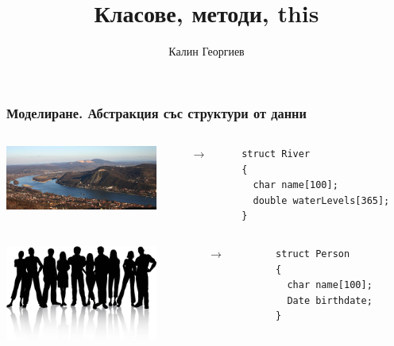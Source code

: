 \documentclass{beamer}
\begin{document}
\title[Обектно ориентирано програмиране]{Класове, методи, this}
\author{Калин Георгиев}
\frame{\titlepage}


\begin{frame}[fragile]
\frametitle{Моделиране. Абстракция със структури от данни}


\begin{columns}[c]
  \begin{column}{0.4\textwidth}
  \includegraphics[width=5cm]{images/danube}
  \end{column}
  \begin{column}{0.1\textwidth}
  $\rightarrow$
  \end{column}
  \begin{column}{0.4\textwidth}
\begin{flushleft}
\begin{lstlisting}
struct River
{
  char name[100];
  double waterLevels[365];
}
\end{lstlisting}
\end{flushleft}
  \end{column}
\end{columns}


\vspace{30px}

\begin{columns}[c]
  \begin{column}{0.4\textwidth}
  \includegraphics[width=5cm]{images/people}
  \end{column}
  \begin{column}{0.1\textwidth}
  $\rightarrow$
  \end{column}
  \begin{column}{0.4\textwidth}
\begin{flushleft}
\begin{lstlisting}
struct Person
{
  char name[100];
  Date birthdate;
}
\end{lstlisting}
\end{flushleft}
  \end{column}
\end{columns}


\end{frame}
\end{document}
